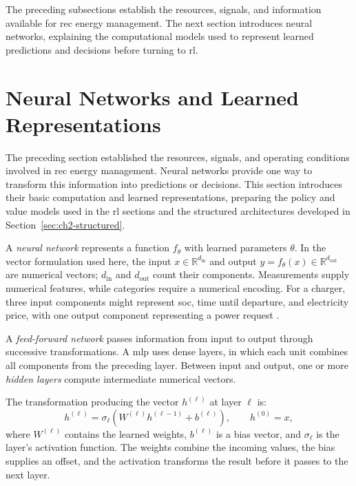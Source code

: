 The preceding subsections establish the resources, signals, and information available for \gls{rec} energy management. The next section introduces neural networks, explaining the computational models used to represent learned predictions and decisions before turning to \gls{rl}.

\FloatBarrier
\section{Neural Networks and Learned Representations}
\label{sec:ch2-neural}

The preceding section established the resources, signals, and operating conditions involved in \gls{rec} energy management. Neural networks provide one way to transform this information into predictions or decisions. This section introduces their basic computation and learned representations, preparing the policy and value models used in the \gls{rl} sections and the structured architectures developed in Section~\ref{sec:ch2-structured}.

A \emph{neural network} represents a function $f_\theta$ with learned parameters $\theta$. In the vector formulation used here, the input $x\in\mathbb R^{d_{\mathrm{in}}}$ and output $y=f_\theta(x)\in\mathbb R^{d_{\mathrm{out}}}$ are numerical vectors; $d_{\mathrm{in}}$ and $d_{\mathrm{out}}$ count their components. Measurements supply numerical features, while categories require a numerical encoding. For a charger, three input components might represent \gls{soc}, time until departure, and electricity price, with one output component representing a power request \parencite{goodfellow2016deep}.

A \emph{feed-forward network} passes information from input to output through successive transformations. A \gls{mlp} uses dense layers, in which each unit combines all components from the preceding layer. Between input and output, one or more \emph{hidden layers} compute intermediate numerical vectors.

The transformation producing the vector $h^{(\ell)}$ at layer $\ell$ is:
\begin{equation}
h^{(\ell)}=\sigma_\ell\!\left(W^{(\ell)}h^{(\ell-1)}+b^{(\ell)}\right),
\qquad h^{(0)}=x,
\label{eq:ch2-neural-layer}
\end{equation}
where $W^{(\ell)}$ contains the learned weights, $b^{(\ell)}$ is a bias vector, and $\sigma_\ell$ is the layer's activation function. The weights combine the incoming values, the bias supplies an offset, and the activation transforms the result before it passes to the next layer.

